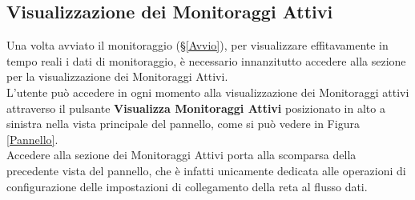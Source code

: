 \subsection{Visualizzazione dei Monitoraggi Attivi}\label{MonitoraggiAttivi}

Una volta avviato il monitoraggio (§\ref{Avvio}), per visualizzare effitavamente in tempo reali i dati di monitoraggio, è necessario innanzitutto accedere alla sezione per la visualizzazione dei Monitoraggi Attivi.\\
L'utente può accedere in ogni momento alla visualizzazione dei Monitoraggi attivi attraverso il pulsante \textbf{Visualizza Monitoraggi Attivi} posizionato in alto a sinistra nella vista principale del pannello, come si può vedere in Figura \ref{Pannello}.\\

Accedere alla sezione dei Monitoraggi Attivi porta alla scomparsa della precedente vista del pannello, che è infatti unicamente dedicata alle operazioni di configurazione delle impostazioni di collegamento della reta al flusso dati.
